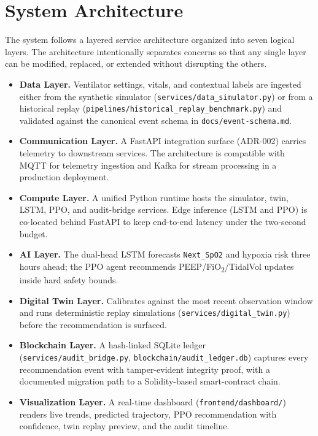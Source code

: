 \documentclass[12pt,a4paper,oneside]{report}
\begin{document}
\section{System Architecture}
The system follows a layered service architecture organized into seven logical layers. The architecture intentionally separates concerns so that any single layer can be modified, replaced, or extended without disrupting the others.
\begin{itemize}[leftmargin=*]
  \item \textbf{Data Layer.} Ventilator settings, vitals, and contextual labels are ingested either from the synthetic simulator (\texttt{services/data\_simulator.py}) or from a historical replay (\texttt{pipelines/historical\_replay\_benchmark.py}) and validated against the canonical event schema in \texttt{docs/event-schema.md}.
  \item \textbf{Communication Layer.} A FastAPI integration surface (ADR-002) carries telemetry to downstream services. The architecture is compatible with MQTT for telemetry ingestion and Kafka for stream processing in a production deployment.
  \item \textbf{Compute Layer.} A unified Python runtime hosts the simulator, twin, LSTM, PPO, and audit-bridge services. Edge inference (LSTM and PPO) is co-located behind FastAPI to keep end-to-end latency under the two-second budget.
  \item \textbf{AI Layer.} The dual-head LSTM forecasts \texttt{Next\_SpO2} and hypoxia risk three hours ahead; the PPO agent recommends PEEP/FiO\textsubscript{2}/TidalVol updates inside hard safety bounds.
  \item \textbf{Digital Twin Layer.} Calibrates against the most recent observation window and runs deterministic replay simulations (\texttt{services/digital\_twin.py}) before the recommendation is surfaced.
  \item \textbf{Blockchain Layer.} A hash-linked SQLite ledger (\texttt{services/audit\_bridge.py}, \texttt{blockchain/audit\_ledger.db}) captures every recommendation event with tamper-evident integrity proof, with a documented migration path to a Solidity-based smart-contract chain.
  \item \textbf{Visualization Layer.} A real-time dashboard (\texttt{frontend/dashboard/}) renders live trends, predicted trajectory, PPO recommendation with confidence, twin replay preview, and the audit timeline.
\end{itemize}
\end{document}
